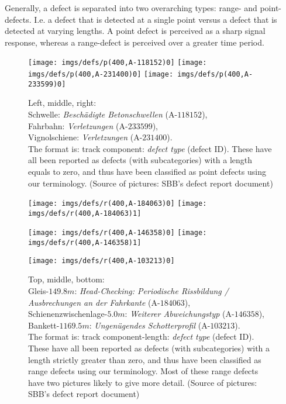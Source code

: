 Generally, a defect is separated into two overarching types: range- and point-defects. I.e. a defect that is detected at a single point versus a defect that is detected at varying lengths. A point defect is perceived as a sharp signal response, whereas a range-defect is perceived over a greater time period. 
\begin{figure}[H]
	\centering
	\texttt{[image: imgs/defs/p(400,A-118152)0]}
	\texttt{[image: imgs/defs/p(400,A-231400)0]}
	\texttt{[image: imgs/defs/p(400,A-233599)0]}
	\caption{Left, middle, right: \\Schwelle: \textit{Beschädigte Betonschwellen} (A-$118152$), \\Fahrbahn: \textit{Verletzungen} (A-$233599$), \\Vignolschiene: \textit{Verletzungen} (A-$231400$). \\The format is: track component: \textit{defect type} (defect ID). These have all been reported as defects (with subcategories) with a length equals to zero, and thus have been classified as point defects using our terminology. (Source of pictures: SBB's defect report document)}
\end{figure}
\raggedbottom
\begin{figure}[H]
	\centering
	\texttt{[image: imgs/defs/r(400,A-184063)0]}
	\texttt{[image: imgs/defs/r(400,A-184063)1]}
	
	\texttt{[image: imgs/defs/r(400,A-146358)0]}
	\texttt{[image: imgs/defs/r(400,A-146358)1]}
\end{figure}
\begin{figure}[H]
	\centering
	\texttt{[image: imgs/defs/r(400,A-103213)0]}
	\caption{Top, middle, bottom:\\ Gleis-$149.8 m$: \textit{Head-Checking: Periodische Rissbildung / Ausbrechungen an der Fahrkante} (A-$184063$),\\ Schienenzwischenlage-$5.0 m$: \textit{Weiterer Abweichungstyp} (A-$146358$),\\ Bankett-$1169.5 m$: \textit{Ungenügendes Schotterprofil} (A-$103213$).\\ The format is: track component-length: \textit{defect type} (defect ID). These have all been reported as defects (with subcategories) with a length strictly greater than zero, and thus have been classified as range defects using our terminology. Most of these range defects have two pictures likely to give more detail. (Source of pictures: SBB's defect report document)}
\end{figure}
